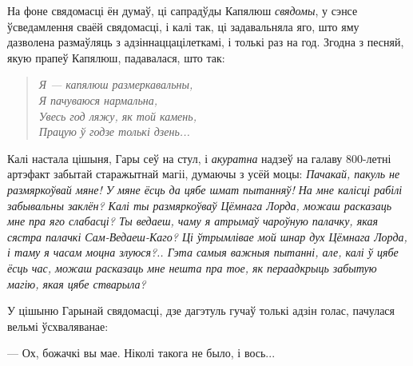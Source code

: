 На фоне свядомасці ён думаў, ці сапрадўды Капялюш \emph{свядомы},
у сэнсе ўсведамлення сваёй свядомасці, і калі так, ці задавальняла яго,
што яму дазволена размаўляць з адзіннаццацілеткамі, і толькі раз на год. 
Згодна з песняй, якую прапеў Капялюш, падавалася, што так:

\begin{verse}%
    \itshape
    Я --- капялюш размеркавальны,\\
    Я пачуваюся нармальна,\\
    Увесь год ляжу, як той камень,\\
    Працую ў годзе толькі дзень...
\end{verse}

Калі настала цішыня, Гары сеў на стул, і \emph{акуратна} надзеў на галаву 
800-летні артэфакт забытай старажытнай магіі, думаючы з усёй моцы: 
\emph{Пачакай, пакуль не размяркоўвай мяне! У мяне ёсць да цябе шмат  
пытанняў! На мне калісці рабілі забывальны заклён? Калі ты размяркоўваў Цёмнага Лорда,
можаш расказаць мне пра яго слабасці? Ты ведаеш, чаму я атрымаў чароўную палачку,
якая сястра палачкі Сам-Ведаеш-Каго? Ці ўтрымлівае мой шнар дух Цёмнага Лорда,
і таму я часам моцна злуюся?.. Гэта самыя важныя пытанні, але, калі ў цябе ёсць час,
можаш расказаць мне нешта пра тое, як пераадкрыць забытую магію, якая цябе стварыла?}

У цішыню Гарынай свядомасці, дзе дагэтуль гучаў толькі адзін голас, 
пачулася вельмі ўсхваляванае:

--- Ох, божачкі вы мае. Ніколі такога не было, і вось...
